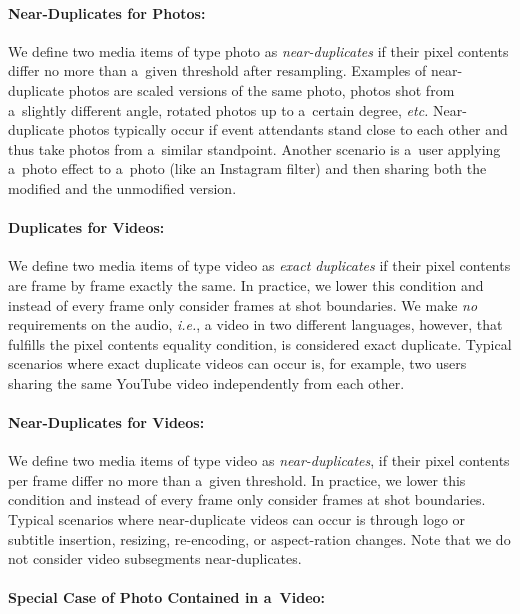 \paragraph{Near-Duplicates for Photos:}

We define two media items of type photo as \emph{near-duplicates}
if their pixel contents differ no more than a~given threshold after resampling.
Examples of near-duplicate photos are scaled versions
of the same photo, photos shot from a~slightly different angle,
rotated photos up to a~certain degree, \emph{etc.}
Near-duplicate photos typically occur if event attendants
stand close to each other and thus take photos
from a~similar standpoint.
Another scenario is a~user applying a~photo effect to a~photo
(like an Instagram filter) and then sharing both the modified
and the unmodified version.

\paragraph{Duplicates for Videos:}

We define two media items of type video as \emph{exact duplicates}
if their pixel contents are frame by frame exactly the same.
In practice, we lower this condition and instead of every frame
only consider frames at shot boundaries.
We make \emph{no} requirements on the audio, \emph{i.e.},
a video in two different languages, however, that fulfills the 
pixel contents equality condition, is considered exact duplicate.
Typical scenarios where exact duplicate videos can occur is,
for example, two users sharing the same YouTube video
independently from each other.

\paragraph{Near-Duplicates for Videos:}

We define two media items of type video as \emph{near-duplicates},
if their pixel contents per frame differ no more
than a~given threshold.
In practice, we lower this condition and instead of every frame
only consider frames at shot boundaries.
Typical scenarios where near-duplicate videos can occur is through
logo or subtitle insertion, resizing, re-encoding,
or aspect-ration changes.
Note that we do not consider video subsegments near-duplicates.

\paragraph{Special Case of Photo Contained in a~Video:}

